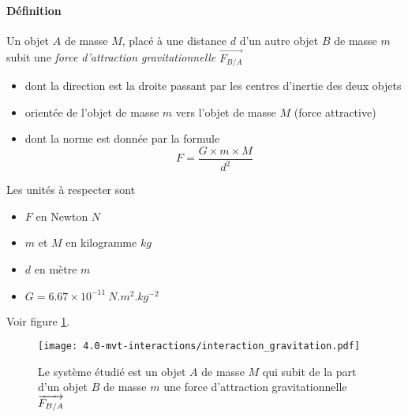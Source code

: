 \paragraph{Définition} Un objet $A$ de masse $M$, placé à une distance $d$ d'un autre objet $B$ de masse $m$ subit une
\textit{force d'attraction gravitationnelle} $\overrightarrow{F_{B/A}}$ 
\begin{itemize}
 \item dont la direction est la droite passant par les centres d'inertie des deux objets
 \item orientée de l'objet de masse $m$ vers l'objet de masse $M$ (force attractive)
 \item dont la norme est donnée par la formule $$ F = \frac{G \times m \times M}{d^2}$$ 
\end{itemize}
Les unités à respecter sont
\begin{itemize}
 \item $F$ en Newton $N$
 \item $m$ et $M$ en kilogramme $kg$
 \item $d$ en mètre $m$
 \item $G=6.67 \times 10^{-11}~N.m^2.kg^{-2}$
\end{itemize}
Voir figure \ref{fig:interaction_gravitation}.
\begin{figure}[h!]
  \begin{center}
      \texttt{[image: 4.0-mvt-interactions/interaction\_gravitation.pdf]}
  \end{center}
  \caption{Le système étudié est un objet $A$ de masse $M$ qui subit de la part d'un objet  $B$ de masse $m$ une force d'attraction gravitationnelle $\protect\overrightarrow{F_{B/A}} $ }
  \label{fig:interaction_gravitation}
\end{figure}

